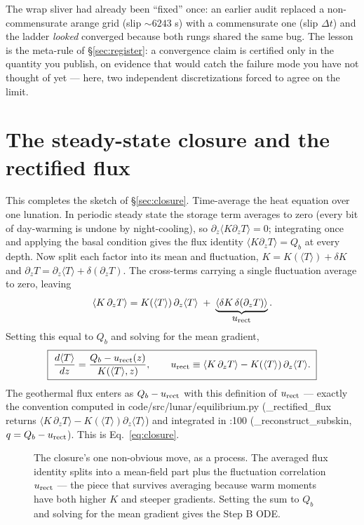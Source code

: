 \documentclass[11pt]{report}
\newcommand{\Tm}{\langle T\rangle}
\newcommand{\code}[1]{{\ttfamily\small #1}}
\begin{document}
\begin{warn}
The wrap sliver had already been ``fixed'' once: an earlier audit replaced a
non-commensurate \code{arange} grid (slip ${\sim}6243$ s) with a
commensurate one (slip $\Delta t$) and the ladder \emph{looked} converged
because both rungs shared the same bug. The lesson is the meta-rule of
\S\ref{sec:register}: a convergence claim is certified only in the quantity
you publish, on evidence that would catch the failure mode you have not
thought of yet --- here, two independent discretizations forced to agree on
the limit.
\end{warn}

\section{The steady-state closure and the rectified flux}\label{app:closure}
This completes the sketch of \S\ref{sec:closure}. Time-average the heat equation
over one lunation. In periodic steady state the storage term averages to zero
(every bit of day-warming is undone by night-cooling), so
$\partial_z\langle K\partial_z T\rangle=0$; integrating once and applying the
basal condition gives the flux identity $\langle K\partial_z T\rangle=Q_b$ at
every depth. Now split each factor into its mean and fluctuation,
$K=K(\Tm)+\delta K$ and $\partial_z T=\partial_z\Tm+\delta(\partial_z T)$. The
cross-terms carrying a single fluctuation average to zero, leaving
\[
\langle K\,\partial_z T\rangle
= K(\Tm)\,\partial_z\Tm \;+\; \underbrace{\langle \delta K\,\delta(\partial_z
T)\rangle}_{\textstyle u_{\rm rect}}.
\]
Setting this equal to $Q_b$ and solving for the mean gradient,
\[
\boxed{\;\frac{d\Tm}{dz}=\frac{Q_b-u_{\rm rect}(z)}{K(\Tm,z)},\qquad
u_{\rm rect}\equiv\langle K\,\partial_z T\rangle-K(\Tm)\,\partial_z\Tm.\;}
\]
The geothermal flux enters as $Q_b-u_{\rm rect}$ with this definition of
$u_{\rm rect}$ --- exactly the convention computed in
\code{code/src/lunar/equilibrium.py} (\code{\_rectified\_flux} returns
$\langle K\,\partial_z T\rangle-K(\Tm)\partial_z\Tm$) and integrated in
\code{:100} (\code{\_reconstruct\_subskin}, $q=Q_b-u_{\rm rect}$). This is
Eq.~\eqref{eq:closure}.

\begin{figure}[htbp]\centering

\caption{The closure's one non-obvious move, as a process. The averaged flux
identity splits into a mean-field part plus the fluctuation correlation
$u_{\rm rect}$ --- the piece that survives averaging because warm moments have
both higher $K$ and steeper gradients. Setting the sum to $Q_b$ and solving
for the mean gradient gives the Step B ODE.}
\label{fig:urectsplit}
\end{figure}
\end{document}

